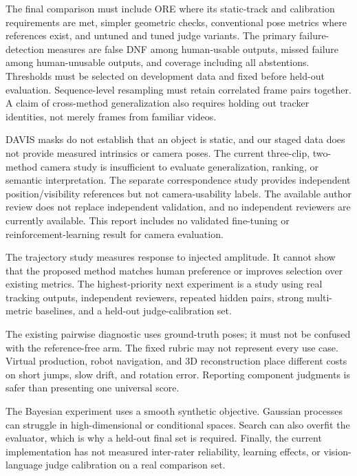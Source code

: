 \documentclass[10pt,twocolumn]{article}
\begin{document}
The final comparison must include ORE where its static-track and calibration requirements are met, simpler geometric checks, conventional pose metrics where references exist, and untuned and tuned judge variants. The primary failure-detection measures are false DNF among human-usable outputs, missed failure among human-unusable outputs, and coverage including all abstentions. Thresholds must be selected on development data and fixed before held-out evaluation. Sequence-level resampling must retain correlated frame pairs together. A claim of cross-method generalization also requires holding out tracker identities, not merely frames from familiar videos.

DAVIS masks do not establish that an object is static, and our staged data does not provide measured intrinsics or camera poses. The current three-clip, two-method camera study is insufficient to evaluate generalization, ranking, or semantic interpretation. The separate correspondence study provides independent position/visibility references but not camera-usability labels. The available author review does not replace independent validation, and no independent reviewers are currently available. This report includes no validated fine-tuning or reinforcement-learning result for camera evaluation.

The trajectory study measures response to injected amplitude. It cannot show that the proposed method matches human preference or improves selection over existing metrics. The highest-priority next experiment is a study using real tracking outputs, independent reviewers, repeated hidden pairs, strong multi-metric baselines, and a held-out judge-calibration set.

The existing pairwise diagnostic uses ground-truth poses; it must not be confused with the reference-free arm. The fixed rubric may not represent every use case. Virtual production, robot navigation, and 3D reconstruction place different costs on short jumps, slow drift, and rotation error. Reporting component judgments is safer than presenting one universal score.

The Bayesian experiment uses a smooth synthetic objective. Gaussian processes can struggle in high-dimensional or conditional spaces. Search can also overfit the evaluator, which is why a held-out final set is required. Finally, the current implementation has not measured inter-rater reliability, learning effects, or vision-language judge calibration on a real comparison set.
\end{document}
